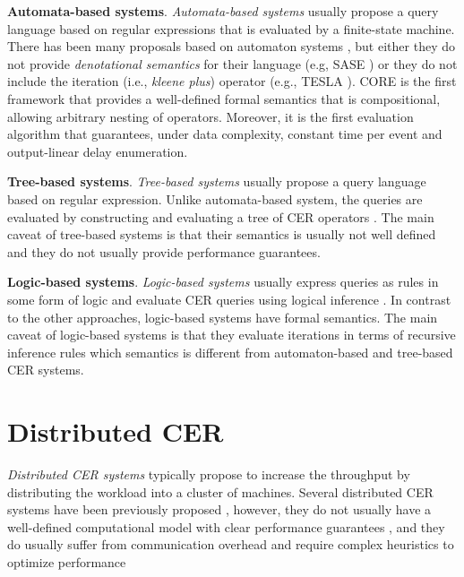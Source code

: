 \textbf{Automata-based systems}. \emph{Automata-based systems} usually propose a query language based on regular expressions that is evaluated by a finite-state machine. There has been many proposals based on automaton systems \cite{survey-systems-1,survey-systems-2}, but either they do not provide \emph{denotational semantics} for their language (e.g, SASE \cite{sase}) or they do not include the iteration (i.e., \emph{kleene plus}) operator (e.g., TESLA \cite{tesla}). CORE \cite{core} is the first framework that provides a well-defined formal semantics that is compositional, allowing arbitrary nesting of operators. Moreover, it is the first evaluation algorithm that guarantees, under data complexity, constant time per event and output-linear delay enumeration.

\textbf{Tree-based systems}. \emph{Tree-based systems} usually propose a query language based on regular expression. Unlike automata-based system, the queries are evaluated by constructing and evaluating a tree of CER operators \cite{tree-based-system-1, tree-based-system-2}. The main caveat of tree-based systems is that their semantics is usually not well defined and they do not usually provide performance guarantees.

\textbf{Logic-based systems}. \emph{Logic-based systems} usually express queries as rules in some form of logic and evaluate CER queries using logical inference \cite{logic-based-system-1, logic-based-system-2}. In contrast to the other approaches, logic-based systems have formal semantics. The main caveat of logic-based systems is that they evaluate iterations in terms of recursive inference rules which semantics is different from automaton-based and tree-based CER systems.

\section{Distributed CER}\label{sec:distributed-cer}

\emph{Distributed CER systems} typically propose to increase the throughput by distributing the workload into a cluster of machines. Several distributed CER systems have been previously proposed \cite{esper, flink-cep, next-cep, distributed-related-work-1, distributed-related-work-2}, however, they do not usually have a well-defined computational model with clear performance guarantees \cite{distributed-related-work-1}, and they do usually suffer from communication overhead and require complex heuristics to optimize performance \cite{distributed-related-work-2}

